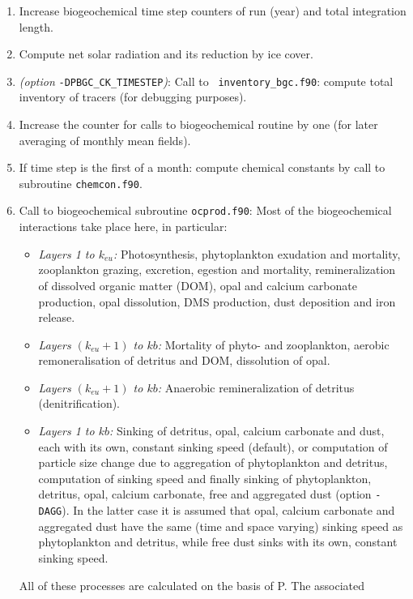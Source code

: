 \documentclass[11pt,a4paper,fleqn,twoside]{article}
\begin{document}
\begin{enumerate}
\item Increase biogeochemical time step counters of run (year)  and total
integration length.
\item Compute net solar radiation and its reduction by ice cover.
\item {\em (option }{\tt -DPBGC\_CK\_TIMESTEP}{\em)}: Call to {\tt
inventory\_bgc.f90}: compute total inventory of tracers (for debugging
purposes). 
\item Increase the counter for calls to biogeochemical routine by one (for
later averaging of monthly mean fields).
\item If time step is the first of a month: compute chemical constants by call
to subroutine {\tt chemcon.f90}.
\item Call to biogeochemical subroutine {\tt ocprod.f90}:  Most of the
biogeochemical interactions take place here, in particular:
        \begin{itemize}
        \item {\em Layers 1 to $k_{eu}$:} Photosynthesis, phytoplankton exudation and
        mortality, zooplankton grazing, excretion, egestion and mortality,
        remineralization of dissolved organic matter (DOM), opal and calcium
        carbonate production, opal dissolution, DMS production, dust deposition
        and iron release. 
        \item {\em Layers $(k_{eu}+1)$ to $kb$:} Mortality of phyto- and zooplankton, aerobic
        remoneralisation of detritus and DOM, dissolution of opal.
        \item {\em Layers $(k_{eu}+1)$ to $kb$:} Anaerobic remineralization of detritus
        (denitrification).
        \item {\em Layers 1 to $kb$:} Sinking of detritus, opal, calcium carbonate
        and dust, each with its own, constant sinking speed (default), or
        computation of particle size change due to aggregation of phytoplankton
        and detritus, computation of sinking speed and finally sinking of
        phytoplankton, detritus, opal, calcium carbonate, free and aggregated
        dust (option {\tt -DAGG}). In the latter case it is assumed that opal,
        calcium carbonate and aggregated dust have the same (time and space
        varying) sinking speed as phytoplankton and detritus, while free dust
        sinks with its own, constant sinking speed.
        \end{itemize}
All of these processes are calculated on the basis of P. The associated

\end{enumerate}
\end{document}
